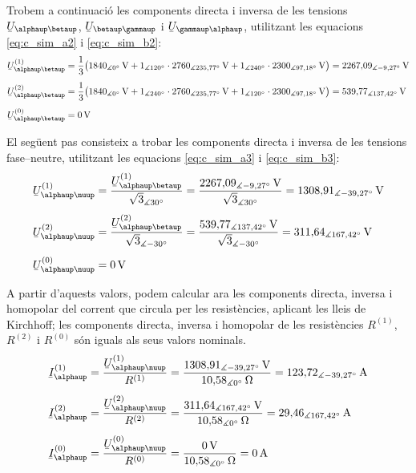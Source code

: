 \begin{exemple}
Trobem a continuaci\'{o} les components directa i inversa de les
tensions $\cmplx{U}_{\alphaup\betaup}$, $\cmplx{U}_{\betaup\gammaup}$ i
$\cmplx{U}_{\gammaup\alphaup}$, utilitzant les equacions
\eqref{eq:c_sim_a2} i \eqref{eq:c_sim_b2}:
\begin{align*}
\cmplx{U}_{\alphaup\betaup}\ap{(1)} &= \frac{1}{3} \big(
1840_{\measuredangle 0\degree}\unit{V} + 1_{\measuredangle
120\degree} \cdot 2760_{\measuredangle 235{,}77\degree}\unit{V} +
1_{\measuredangle 240\degree} \cdot 2300_{\measuredangle
97{,}18\degree}\unit{V} \big) = 2267{,}09_{\measuredangle -9{,}27\degree}\unit{V} \\[1ex]
\cmplx{U}_{\alphaup\betaup}\ap{(2)} &= \frac{1}{3} \big(
1840_{\measuredangle 0\degree}\unit{V} + 1_{\measuredangle
240\degree} \cdot 2760_{\measuredangle 235{,}77\degree}\unit{V} +
1_{\measuredangle 120\degree} \cdot 2300_{\measuredangle
97{,}18\degree}\unit{V} \big) = 539{,}77_{\measuredangle
137{,}42\degree}\unit{V} \\[1ex]
\cmplx{U}_{\alphaup\betaup}\ap{(0)} &= 0\unit{V}
\end{align*}

El seg\"{u}ent pas consisteix a trobar les components directa i inversa
de les tensions fase--neutre, utilitzant les equacions
\eqref{eq:c_sim_a3} i \eqref{eq:c_sim_b3}:
\begin{align*}
\cmplx{U}_{\alphaup\nuup}\ap{(1)} &=
\frac{\cmplx{U}_{\alphaup\betaup}\ap{(1)}}{\sqrt{3}_{\measuredangle
30\degree}} = \frac{2267{,}09_{\measuredangle
-9{,}27\degree}\unit{V}}{\sqrt{3}_{\measuredangle
30\degree}} = 1308{,}91_{\measuredangle -39{,}27\degree}\unit{V} \\[1ex]
\cmplx{U}_{\alphaup\nuup}\ap{(2)} &=
\frac{\cmplx{U}_{\alphaup\betaup}\ap{(2)}}{\sqrt{3}_{\measuredangle
-30\degree}} = \frac{539{,}77_{\measuredangle
137{,}42\degree}\unit{V}}{\sqrt{3}_{\measuredangle -30\degree}} =
311{,}64_{\measuredangle 167{,}42\degree}\unit{V} \\[1ex]
\cmplx{U}_{\alphaup\nuup}\ap{(0)} &= 0\unit{V}
\end{align*}

A partir d'aquests valors, podem calcular ara les components
directa, inversa i homopolar del corrent que circula per les
resist\`{e}ncies, aplicant les lleis de Kirchhoff; les components
directa, inversa i homopolar de les resist\`{e}ncies $R^{(1)}$,
$R^{(2)}$ i $R^{(0)}$ s\'{o}n iguals als seus valors nominals.
\begin{align*}
\cmplx{I}_\alphaup\ap{(1)} &=
\frac{\cmplx{U}_{\alphaup\nuup}\ap{(1)}}{R^{(1)}} =
\frac{1308{,}91_{\measuredangle
-39{,}27\degree}\unit{V}}{10{,}58_{\measuredangle 0 \degree}
\unit{\ohm}} =
123{,}72_{\measuredangle -39{,}27\degree}\unit{A} \\[1ex]
\cmplx{I}_\alphaup\ap{(2)} &=
\frac{\cmplx{U}_{\alphaup\nuup}\ap{(2)}}{R^{(2)}} =
\frac{311{,}64_{\measuredangle
167{,}42\degree}\unit{V}}{10{,}58_{\measuredangle 0 \degree}
\unit{\ohm}} = 29{,}46_{\measuredangle 167{,}42\degree}\unit{A} \\[1ex]
\cmplx{I}_\alphaup\ap{(0)} &=
\frac{\cmplx{U}_{\alphaup\nuup}\ap{(0)}}{R^{(0)}} =
\frac{0\unit{V}}{10{,}58_{\measuredangle 0 \degree}\unit{\ohm}} =
0\unit{A}
\end{align*}


\end{exemple}
